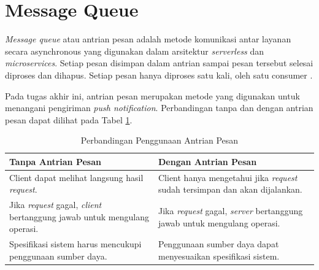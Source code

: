 \section{Message Queue}
\par \textit{Message queue} atau antrian pesan adalah metode komunikasi antar layanan secara asynchronous yang digunakan dalam arsitektur \textit{serverless} dan \textit{microservices}. Setiap pesan disimpan dalam antrian sampai pesan tersebut selesai diproses dan dihapus. Setiap pesan hanya diproses satu kali, oleh satu consumer \cite{message-queue-online}.
\par Pada tugas akhir ini, antrian pesan merupakan metode yang digunakan untuk menangani pengiriman \textit{push notification}. Perbandingan tanpa dan dengan antrian pesan dapat dilihat pada Tabel \ref{t:perbandingan-antrian-pesan}.
\begin{longtable}{|p{4.5cm}|p{4.5cm}|}
	\caption{Perbandingan Penggunaan Antrian Pesan} \label{t:perbandingan-antrian-pesan} \\ \hline
	\rowcolor{lightgray} Tanpa Antrian Pesan & Dengan Antrian Pesan \\ \hline
	Client dapat melihat langsung hasil \textit{request}. & Client hanya mengetahui jika \textit{request} sudah tersimpan dan akan dijalankan. \\ \hline
	Jika \textit{request} gagal, \textit{client} bertanggung jawab untuk mengulang operasi. & Jika \textit{request} gagal, \textit{server} bertanggung jawab untuk mengulang operasi. \\ \hline
	Spesifikasi sistem harus mencukupi penggunaan sumber daya. & Penggunaan sumber daya dapat menyesuaikan spesifikasi sistem. \\ \hline
\end{longtable}

